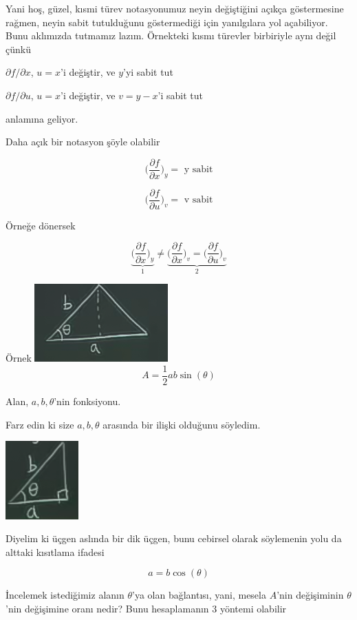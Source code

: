\documentclass[12pt,fleqn]{article}\usepackage{../../common}
\begin{document}
Yani hoş, güzel, kısmi türev notasyonumuz neyin değiştiğini açıkça
göstermesine rağmen, neyin sabit tutulduğunu göstermediği için yanılgılara
yol açabiliyor. Bunu aklımızda tutmamız lazım. Örnekteki kısmı türevler
birbiriyle aynı değil çünkü 

$\partial f/\partial x$, $u=x$'i değiştir, ve $y$'yi sabit tut

$\partial f/\partial u$, $u=x$'i değiştir, ve $v = y-x$'i sabit tut

anlamına geliyor. 

Daha açık bir notasyon şöyle olabilir

$$ 
\bigg( \frac{\partial f}{\partial x}  \bigg)_y = \textrm { y sabit}
$$

$$ 
\bigg( \frac{\partial f}{\partial u}  \bigg)_v = \textrm { v sabit}
$$

Örneğe dönersek

$$ 
\underbrace{
\bigg( \frac{\partial f}{\partial x}  \bigg)_y 
}_{1} 
\ne 
\underbrace{
\bigg( \frac{\partial f}{\partial x}  \bigg)_v = 
\bigg( \frac{\partial f}{\partial u}  \bigg)_v 
}_{2}
$$

Örnek
\includegraphics[height=3cm]{14_1.png}
$$ A = \frac{1}{2}ab \sin(\theta) $$

Alan, $a,b,\theta$'nin fonksiyonu. 

Farz edin ki size $a,b,\theta$ arasında bir ilişki olduğunu söyledim. 

\includegraphics[height=3cm]{14_2.png}

Diyelim ki üçgen aslında bir dik üçgen, bunu cebirsel olarak söylemenin yolu da
alttaki kısıtlama ifadesi

$$ a = b \cos(\theta) $$

İncelemek istediğimiz alanın $\theta$'ya olan bağlantısı, yani, mesela
$A$'nin değişiminin $\theta$'nin değişimine oranı nedir? Bunu hesaplamanın
3 yöntemi olabilir
\end{document}
